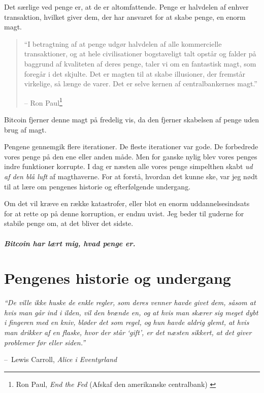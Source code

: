 \documentclass[paper=6in:9in,pagesize=pdftex,
               headinclude=on,footinclude=on,12pt]{scrbook}
\makeatletter
\newenvironment{chapquote}[2][4em]{\setlength{\@tempdima}{#1}%
   \def\chapquote@author{#2}%
   \parshape 1 \@tempdima \dimexpr\textwidth-2\@tempdima\relax%
   \itshape}{\par\normalfont\hfill--\ \chapquote@author\hspace*{\@tempdima}\par\bigskip}
\makeatother
\begin{document}
Det særlige ved penge er, at de er altomfattende. Penge er halvdelen af enhver transaktion, hvilket giver dem, der har ansvaret for at skabe penge, en enorm magt.\begin{quotation}\begin{samepage} \enquote{I betragtning af at penge udgør halvdelen af alle kommercielle transaktioner, og at hele civilisationer bogstaveligt talt opstår og falder på baggrund af kvaliteten af deres penge, taler vi om en fantastisk magt, som foregår i det skjulte. Det er magten til at skabe illusioner, der fremstår virkelige, så længe de varer. Det er selve kernen af centralbankernes magt.} \begin{flushright} -- Ron Paul\footnote{Ron Paul, \textit{End the Fed} (Afskaf den amerikanske centralbank) \cite{end-the-fed}}
\end{flushright}\end{samepage}\end{quotation}

Bitcoin fjerner denne magt på fredelig vis, da den fjerner skabelsen af penge uden brug af magt.

Pengene gennemgik flere iterationer. De fleste iterationer var gode. De forbedrede vores penge på den ene eller anden måde. Men for ganske nylig blev vores penges indre funktioner korrupte. I dag er næsten alle vores penge simpelthen skabt \textit{ud af den blå luft} af magthaverne. For at forstå, hvordan det kunne ske, var jeg nødt til at lære om pengenes historie og efterfølgende undergang.

Om det vil kræve en række katastrofer, eller blot en enorm uddannelsesindsats for at rette op på denne korruption, er endnu uvist. Jeg beder til guderne for stabile penge om, at det bliver det sidste.\paragraph{Bitcoin har lært mig, hvad penge er.}%
%
%
%
%

\chapter{Pengenes historie og undergang}
\label{les:12}

\begin{chapquote}{Lewis Carroll, \textit{Alice i Eventyrland}} \enquote{De ville ikke huske de enkle regler, som deres venner havde givet dem, såsom at hvis man går ind i ilden, vil den brænde en, og at hvis man skærer sig meget dybt i fingeren med en kniv, bløder det som regel, og hun havde aldrig glemt, at hvis man drikker af en flaske, hvor der står \enquote{gift}, er det næsten sikkert, at det giver problemer før eller siden.} \end{chapquote}
\end{document}
